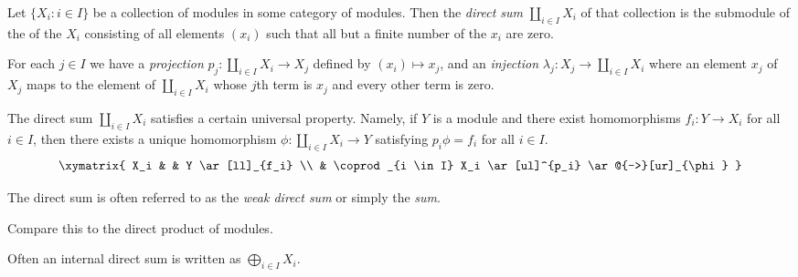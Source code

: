 \documentclass[12pt]{article}
\begin{document}
Let $\{ X_i : i \in I \}$ be a collection of modules 
in some category of modules.
Then the {\it direct sum} $\coprod_{i \in I} X_i$
of that collection is the submodule
of the  of the $X_i$
consisting of all elements $(x_i)$
such that all but a finite number
of the $x_i$ are zero.

For each $j \in I$ we have
a {\it projection} $p_j : \coprod_{i \in I} X_i \to X_j$
defined by $(x_i) \mapsto x_j$,
and
an {\it injection} $\lambda_j : X_j \to \coprod_{i \in I} X_i$
where an element $x_j$ of $X_j$
maps to the element of $\coprod_{i \in I} X_i$
whose $j$th term is $x_j$ and every other term is zero.

The direct sum $\coprod_{i \in I} X_i$
satisfies a certain universal property.
Namely, if $Y$ is a module
and there exist homomorphisms $f_i : Y \to X_i$
for all $i \in I$,
then there exists a unique homomorphism
$\phi : \coprod_{i \in I} X_i \to Y$
satisfying $p_i \phi = f_i$ for all $i \in I$.
$$
\xymatrix{
  X_i
  &
  &
  Y
        \ar[ll]_{f_i}
  \\
  &
  \coprod_{i \in I} X_i
        \ar[ul]^{p_i}
        \ar@{-->}[ur]_{\phi}
}
$$

The direct sum is often referred to
as the {\it weak direct sum}
or simply the {\it sum}.

Compare this to the direct product of modules.

Often an internal direct sum is written as $\bigoplus_{i \in I} X_i$.
\end{document}

